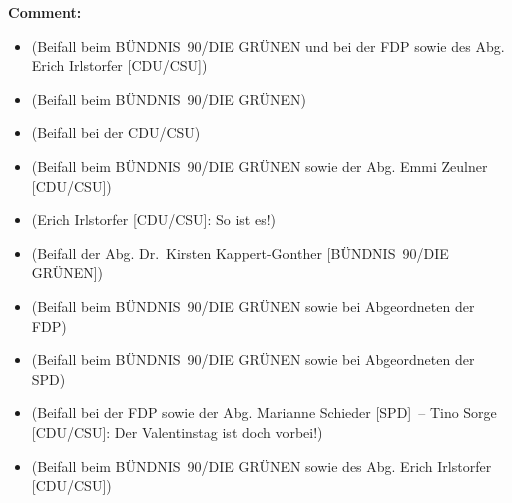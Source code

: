 \documentclass{article}
\begin{document}
\noindent\textbf{Comment:}
\begin{itemize}
    \setlength\itemsep{-3pt}
    \item (Beifall beim BÜNDNIS 90/DIE GRÜNEN und bei der FDP sowie des Abg. Erich Irlstorfer [CDU/CSU])
    \setlength\itemsep{-3pt}
    \item (Beifall beim BÜNDNIS 90/DIE GRÜNEN)
    \setlength\itemsep{-3pt}
    \item (Beifall bei der CDU/CSU)
    \setlength\itemsep{-3pt}
    \item (Beifall beim BÜNDNIS 90/DIE GRÜNEN sowie der Abg. Emmi Zeulner [CDU/CSU])
    \setlength\itemsep{-3pt}
    \item (Erich Irlstorfer [CDU/CSU]: So ist es!)
    \setlength\itemsep{-3pt}
    \item (Beifall der Abg. Dr. Kirsten Kappert-Gonther [BÜNDNIS 90/DIE GRÜNEN])
    \setlength\itemsep{-3pt}
    \item (Beifall beim BÜNDNIS 90/DIE GRÜNEN sowie bei Abgeordneten der FDP)
    \setlength\itemsep{-3pt}
    \item (Beifall beim BÜNDNIS 90/DIE GRÜNEN sowie bei Abgeordneten der SPD)
    \setlength\itemsep{-3pt}
    \item (Beifall bei der FDP sowie der Abg. Marianne Schieder [SPD] – Tino Sorge [CDU/CSU]: Der Valentinstag ist doch vorbei!)
    \setlength\itemsep{-3pt}
    \item (Beifall beim BÜNDNIS 90/DIE GRÜNEN sowie des Abg. Erich Irlstorfer [CDU/CSU])
\end{itemize}
\end{document}
